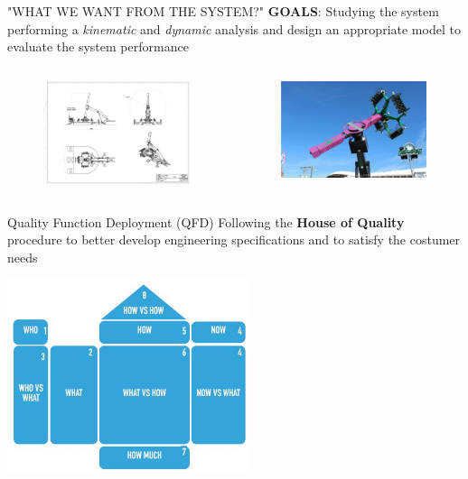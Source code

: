 \documentclass{beamer}              %
\begin{document}
	\begin{frame}{\small "WHAT WE WANT FROM THE SYSTEM?"}
		\textbf{GOALS}: Studying the system performing a \emph{kinematic} and \emph{dynamic} analysis and design an appropriate model to evaluate the system performance
		
		\medskip
		
		\begin{columns}
			\begin{column}{0.5\textwidth}
				\begin{figure}
					\includegraphics[width=150pt]{immagini/competitorsData.jpg}
					\label{disegno3D}
				\end{figure}	
			\end{column}
			\begin{column}{0.5\textwidth}
				\begin{figure}
					\includegraphics[width=150pt]{immagini/Pegasus2.jpg}
					\label{Pegasus2}
				\end{figure}
			\end{column}
		\end{columns}
	\end{frame}
	\begin{frame}{Quality Function Deployment (QFD)}
		\centering
		Following the \textbf{House of Quality} procedure to better develop engineering specifications and to satisfy the costumer needs
		
		\medskip
		
		\centering
		\includegraphics[width=200pt]{immagini/QFD.JPG}			
	\end{frame}
\end{document}
